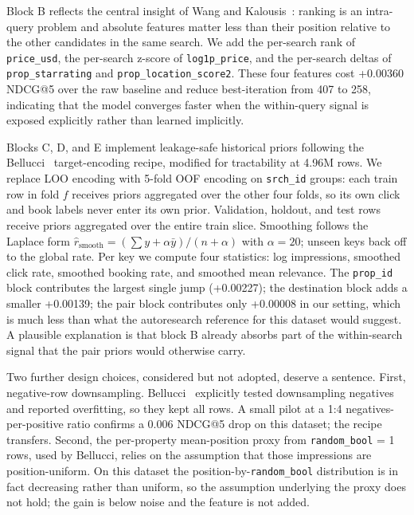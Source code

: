 Block B reflects the central insight of Wang and Kalousis~\cite{wang2014expedia}: ranking is an intra-query problem and absolute features matter less than their position relative to the other candidates in the same search. We add the per-search rank of \texttt{price\_usd}, the per-search z-score of \texttt{log1p\_price}, and the per-search deltas of \texttt{prop\_starrating} and \texttt{prop\_location\_score2}. These four features cost +0.00360 NDCG@5 over the raw baseline and reduce best-iteration from 407 to 258, indicating that the model converges faster when the within-query signal is exposed explicitly rather than learned implicitly.

Blocks C, D, and E implement leakage-safe historical priors following the Bellucci~\cite{bellucci2021dmt} target-encoding recipe, modified for tractability at 4.96M rows. We replace LOO encoding with 5-fold OOF encoding on \texttt{srch\_id} groups: each train row in fold $f$ receives priors aggregated over the other four folds, so its own click and book labels never enter its own prior. Validation, holdout, and test rows receive priors aggregated over the entire train slice. Smoothing follows the Laplace form $\widehat{r}_{\text{smooth}} = (\sum y + \alpha \bar y) / (n + \alpha)$ with $\alpha = 20$; unseen keys back off to the global rate. Per key we compute four statistics: log impressions, smoothed click rate, smoothed booking rate, and smoothed mean relevance. The \texttt{prop\_id} block contributes the largest single jump (+0.00227); the destination block adds a smaller +0.00139; the pair block contributes only +0.00008 in our setting, which is much less than what the autoresearch reference for this dataset would suggest. A plausible explanation is that block B already absorbs part of the within-search signal that the pair priors would otherwise carry.

Two further design choices, considered but not adopted, deserve a sentence. First, negative-row downsampling. Bellucci~\cite{bellucci2021dmt} explicitly tested downsampling negatives and reported overfitting, so they kept all rows. A small pilot at a 1:4 negatives-per-positive ratio confirms a 0.006 NDCG@5 drop on this dataset; the recipe transfers. Second, the per-property mean-position proxy from \texttt{random\_bool} = 1 rows, used by Bellucci, relies on the assumption that those impressions are position-uniform. On this dataset the position-by-\texttt{random\_bool} distribution is in fact decreasing rather than uniform, so the assumption underlying the proxy does not hold; the gain is below noise and the feature is not added.
